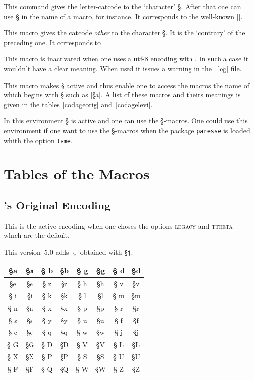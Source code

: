 \documentclass[full, english]{l3doc}
\newcommand*\PSVerb[1]{\texttt{\S #1}}
\newcommand\Option[1]{\textsc{#1}}
\begin{document}
\DescribeMacro{\makeparesseletter}
This command gives the letter-catcode to the `character' §. After that
one can use § in the name of a macro, for instance. It corresponds to
the well-known |\makeatletter|.

\DescribeMacro{\makeparesseother}
This macro gives the catcode \emph{other} to the character §. It is
the `contrary' of the preceding one. It corresponds to |\makeatother|.

This macro is inactivated when one uses a utf-8 encoding with
. In such a case it wouldn't have a clear meaning. When
used it issues a warning in the |.log| file.

\DescribeMacro{\ActiveLaParesse}
This macro makes § active and thus enable one to access the macros the
name of which begins with § such as |§a|. A list of these macros and
theirs meanings is given in the tables~\ref{codageorig}
and~\ref{codagelevi}.

In this environment § is active and one can use the §-macros. One
could use this environment if one want to use the §-macros when the
package \texttt{paresse} is loaded whith the option \texttt{tame}.

\newpage{}

\section{Tables of the Macros}

\subsection{'s Original Encoding}

This is the active encoding when one choses the options \Option{legacy} and
\Option{ttheta} which are the default.

This version~5.0 adds \(\varsigma\) obtained with \PSVerb{j}.

\begin{center}\Large
\begin{ParesseActive} \label{codageorig}
\begin{tabular}{*4{||>{\ttfamily \S}c|c}||}\hline
a & §a & b & §b & g & §g & d & §d\\ \hline
e & §e & z & §z & h & §h & v & §v\\ \hline
i & §i & k & §k & l & §l & m & §m\\ \hline
n & §n & x & §x & p & §p & r & §r\\ \hline
s & §s & y & §y & u & §u & f & §f\\ \hline
c & §c & q & §q & w & §w & j & §j\\ \hline\hline
G & §G & D & §D & V & §V & L & §L\\ \hline
X & §X & P & §P & S & §S & U & §U\\ \hline
F & §F & Q & §Q & W & §W & Z & §Z\\ \hline
\end{tabular}
\end{ParesseActive}
\end{center}
\end{document}
